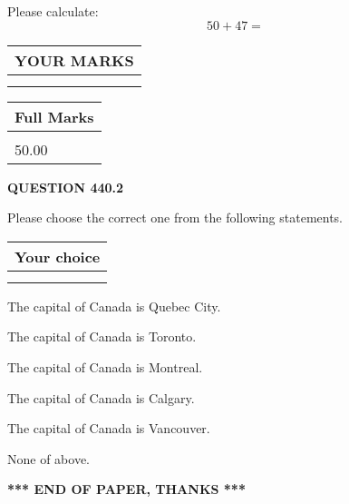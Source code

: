 \documentclass[12pt]{article}
\begin{document}
  
 
Please calculate:
\begin{equation}
50 +  %
47 = \nonumber
\end{equation}
 

 

 
  
\vspace{0.2in}
  
\noindent\begin{tabular}{|l|}
\hline
 YOUR MARKS  \\
\hline
 \\ 
 \\ 
\hline
\end{tabular}
\hspace{0.05in} \begin{tabular}{|l|}
\hline
 Full Marks  \\
\hline
 \\ 
50.00 \\
\hline
\end{tabular}
{\textbf{\Large{QUESTION
440.2 
}}}
  
  
Please choose the correct one from the following statements.
  
  
\noindent\hspace{3.0in} \begin{tabular}{|l|}
\hline
Your choice \\
\hline
 \\ 
 \\ 
\hline
\end{tabular}
  
  
 
 
The capital of Canada is Quebec City.
 
 
The capital of Canada is Toronto.
 
 
The capital of Canada is Montreal.
 
 
The capital of Canada is Calgary.
 
 
The capital of Canada is Vancouver.
 
 
 None of above.
 
 
   
   
 \vspace{0.2in}
 
   
   
   
   
\vspace{1.0in} 
{\textbf{\large{ *** END OF PAPER, THANKS *** }}} 
   
\end{document}
